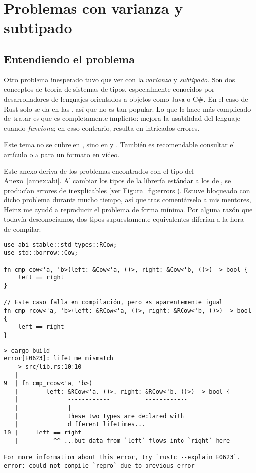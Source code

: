 
\chapter{Problemas con varianza y subtipado}\label{annex:covariance}

\section{Entendiendo el problema}

Otro problema inesperado tuvo que ver con la \emph{varianza} y \emph{subtipado}.
Son dos conceptos de teoría de sistemas de tipos, especialmente conocidos por
desarrolladores de lenguajes orientados a objetos como Java o C\#. En el caso de
Rust solo se da en las \lifetimes, así que no es tan popular. Lo que lo hace más
complicado de tratar es que es completamente implícito: mejora la usabilidad del
lenguaje cuando \emph{funciona}; en caso contrario, resulta en intricados
errores.

Este tema no se cubre en , sino en  y . También es
recomendable consultar el artículo  o a
\textcite{video_covandcontra} para un formato en vídeo.

Este anexo deriva de los problemas encontrados con el tipo  del
Anexo~\ref{annex:abi}. Al cambiar los tipos de la librería estándar a los de
\abistable, se producían errores de \lifetimes inexplicables (ver
Figura~\ref{fig:errors}). Estuve bloqueado con dicho problema durante mucho
tiempo, así que tras comentárselo a mis mentores, Heinz me ayudó a reproducir el
problema de forma mínima. Por alguna razón que todavía desconocíamos, dos tipos
supuestamente equivalentes diferían a la hora de compilar:

\begin{verbatim}
use abi_stable::std_types::RCow;
use std::borrow::Cow;

fn cmp_cow<'a, 'b>(left: &Cow<'a, ()>, right: &Cow<'b, ()>) -> bool {
    left == right
}

// Este caso falla en compilación, pero es aparentemente igual
fn cmp_rcow<'a, 'b>(left: &RCow<'a, ()>, right: &RCow<'b, ()>) -> bool {
    left == right
}
\end{verbatim}

\begin{verbatim}
> cargo build
error[E0623]: lifetime mismatch
  --> src/lib.rs:10:10
   |
9  | fn cmp_rcow<'a, 'b>(
   |        left: &RCow<'a, ()>, right: &RCow<'b, ()>) -> bool {
   |              ------------          ------------
   |              |
   |              these two types are declared with
   |              different lifetimes...
10 |     left == right
   |          ^^ ...but data from `left` flows into `right` here

For more information about this error, try `rustc --explain E0623`.
error: could not compile `repro` due to previous error
\end{verbatim}

